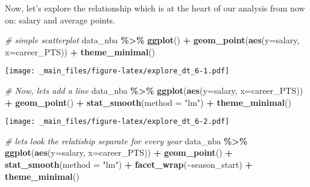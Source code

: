 \documentclass[
]{book}
\newenvironment{Shaded}{\begin{snugshade}}{\end{snugshade}}
\newcommand{\AttributeTok}[1]{\textcolor[rgb]{0.13,0.29,0.53}{#1}}
\newcommand{\CommentTok}[1]{\textcolor[rgb]{0.56,0.35,0.01}{\textit{#1}}}
\newcommand{\FunctionTok}[1]{\textcolor[rgb]{0.13,0.29,0.53}{\textbf{#1}}}
\newcommand{\NormalTok}[1]{#1}
\newcommand{\SpecialCharTok}[1]{\textcolor[rgb]{0.81,0.36,0.00}{\textbf{#1}}}
\newcommand{\StringTok}[1]{\textcolor[rgb]{0.31,0.60,0.02}{#1}}
\begin{document}
Now, let's explore the relationship which is at the heart of our analysis from now on: salary and average points.

\begin{Shaded}
\begin{Highlighting}[]
\CommentTok{\# simple scatterplot}
\NormalTok{data\_nba }\SpecialCharTok{\%\textgreater{}\%} \FunctionTok{ggplot}\NormalTok{() }\SpecialCharTok{+}
\FunctionTok{geom\_point}\NormalTok{(}\FunctionTok{aes}\NormalTok{(}\AttributeTok{y=}\NormalTok{salary, }\AttributeTok{x=}\NormalTok{career\_PTS)) }\SpecialCharTok{+} 
  \FunctionTok{theme\_minimal}\NormalTok{()}
\end{Highlighting}
\end{Shaded}

\texttt{[image: \_main\_files/figure-latex/explore\_dt\_6-1.pdf]}

\begin{Shaded}
\begin{Highlighting}[]
\CommentTok{\# Now, let\textquotesingle{}s add a line}
\NormalTok{data\_nba }\SpecialCharTok{\%\textgreater{}\%} 
  \FunctionTok{ggplot}\NormalTok{(}\FunctionTok{aes}\NormalTok{(}\AttributeTok{y=}\NormalTok{salary, }\AttributeTok{x=}\NormalTok{career\_PTS)) }\SpecialCharTok{+}
    \FunctionTok{geom\_point}\NormalTok{() }\SpecialCharTok{+} 
     \FunctionTok{stat\_smooth}\NormalTok{(}\AttributeTok{method =} \StringTok{"lm"}\NormalTok{) }\SpecialCharTok{+} 
       \FunctionTok{theme\_minimal}\NormalTok{()}
\end{Highlighting}
\end{Shaded}

\texttt{[image: \_main\_files/figure-latex/explore\_dt\_6-2.pdf]}

\begin{Shaded}
\begin{Highlighting}[]
\CommentTok{\# let\textquotesingle{}s look the relatiship separate for every year}
\NormalTok{data\_nba }\SpecialCharTok{\%\textgreater{}\%} 
  \FunctionTok{ggplot}\NormalTok{(}\FunctionTok{aes}\NormalTok{(}\AttributeTok{y=}\NormalTok{salary, }\AttributeTok{x=}\NormalTok{career\_PTS)) }\SpecialCharTok{+}
    \FunctionTok{geom\_point}\NormalTok{() }\SpecialCharTok{+} 
     \FunctionTok{stat\_smooth}\NormalTok{(}\AttributeTok{method =} \StringTok{"lm"}\NormalTok{) }\SpecialCharTok{+} 
        \FunctionTok{facet\_wrap}\NormalTok{(}\SpecialCharTok{\textasciitilde{}}\NormalTok{season\_start) }\SpecialCharTok{+} 
       \FunctionTok{theme\_minimal}\NormalTok{()}
\end{Highlighting}
\end{Shaded}
\end{document}
